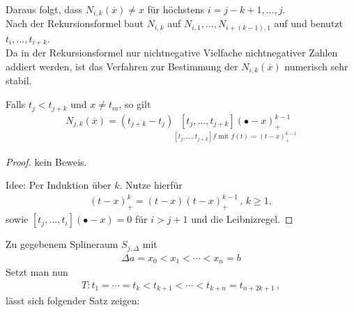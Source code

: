 Daraus folgt, dass $N_{i,k}(\overline{x})\neq x$ 
für höchstens $i=j-k+1,\dots, j$.\\
Nach der Rekursionsformel baut $N_{i,k}$ auf 
$N_{i,1},\dots , N_{i+(k-1),1}$ auf und
benutzt $t_i,\dots, t_{i+k}$.\\
Da in der Rekursionsformel nur nichtnegative Vielfache
nichtnegativer Zahlen addiert werden,
ist das Verfahren zur Bestimmung der $N_{i,k}(\overline{x})$
numerisch sehr stabil.

\begin{Leme}
  Falls $t_j<t_{j+k}$ und $x\neq t_m$,
so gilt
\begin{gather}
  N_{j,k}(\overline{x})=(t_{j+k}-t_j)\underset{
    [t_j,\dots, t_{j+k}]f\text{ mit } f(t)\coloneqq (t-x)_+^{k-1}}
  {[t_j,\dots,t_{j+k}](\bullet -x)_+^{k-1}}
  \label{VI.2.5}
\end{gather}
\end{Leme}

\begin{proof}
  kein Beweis.

 Idee: Per Induktion über $k$. Nutze hierfür
  \begin{gather*}
    (t-x)_{+}^k = (t-x)(t-x)_{+}^{k-1}\,,\, k \geq 1,
  \end{gather*}
  sowie $[t_j , \dotsc, t_i]( \bullet - x) = 0$ für $i > j+1$ und die Leibnizregel.
\end{proof}

  Zu gegebenem Splineraum $S_{j,\Delta}$ mit
  \begin{gather}
    \Delta a=x_0 < x_1 < \dotsm < x_n = b
    \label{VI.2.6}
  \end{gather}
  Setzt man nun 
\begin{gather}
  T: t_1 = \dotsm = t_k < t_{k+1} < \dotsm < t_{k+n} =
  t_{n+2k+1}\, ,
  \label{VI.2.7}
\end{gather} lässt sich folgender Satz zeigen:




